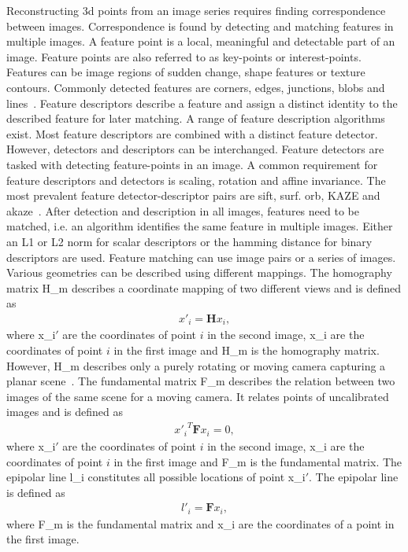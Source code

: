 Reconstructing \gls{3d} points from an image series requires finding correspondence between images. Correspondence is found by detecting and matching features in multiple images. A feature point is a local, meaningful and detectable part of an image. Feature points are also referred to as key-points or interest-points. Features can be image regions of sudden change, shape features or texture contours. Commonly detected features are corners, edges, junctions, blobs and lines~\cite{Tareen2018ABRISK}. Feature descriptors describe a feature and assign a distinct identity to the described feature for later matching. A range of feature description algorithms exist. Most feature descriptors are combined with a distinct feature detector. However, detectors and descriptors can be interchanged. Feature detectors are tasked with detecting feature-points in an image. A common requirement for feature descriptors and detectors is scaling, rotation and affine invariance. The most prevalent feature detector-descriptor pairs are \gls{sift}, \gls{surf}. \gls{orb}, KAZE and \gls{akaze}~\cite{Tareen2018ABRISK}.
After detection and description in all images, features need to be matched, i.e. an algorithm identifies the same feature in multiple images. Either an L1 or L2 norm for scalar descriptors or the hamming distance for binary descriptors are used. Feature matching can use image pairs or a series of images. Various geometries can be described using different mappings. The homography matrix \gls{H_m} describes a coordinate mapping of two different views and is defined as
\begin{align}
    x'_i = \textbf{H}x_i, \label{eq:homography_m}
\end{align}
where \gls{x_i}$'$ are the coordinates of point $i$ in the second image, \gls{x_i} are the coordinates of point $i$ in the first image and \gls{H_m} is the homography matrix. However, \gls{H_m} describes only a purely rotating or moving camera capturing a planar scene~\cite{schonberger2016structure}. The fundamental matrix \gls{F_m} describes the relation between two images of the same scene for a moving camera. It relates points of uncalibrated images and is defined as
\begin{align}
    {x'_i}^{T}\textbf{F}x_i = 0, \label{eq:fundamental_m}
\end{align}
where \gls{x_i}$'$ are the coordinates of point $i$ in the second image, \gls{x_i} are the coordinates of point $i$ in the first image and \gls{F_m} is the fundamental matrix. The epipolar line \gls{l_i} constitutes all possible locations of point \gls{x_i}$'$. The epipolar line is defined as
\begin{align}
    l'_i = \textbf{F}x_i, \label{eq:epipolar_l}
\end{align}
where \gls{F_m} is the fundamental matrix and \gls{x_i} are the coordinates of a point in the first image.

